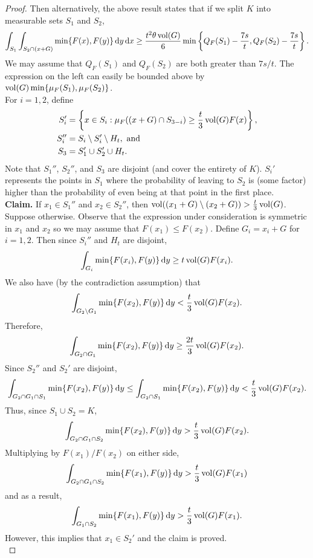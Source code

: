 \begin{proof}
	Then alternatively, the above result states that if we split $K$ into measurable sets $S_1$ and $S_2$,
	\[ \int_{S_1} \int_{S_2\cap (x+G)} \min\{F(x),F(y)\}\operatorname{d}\!{y}\operatorname{d}\!{x} \geq \frac{t^2\theta\operatorname{vol}(G)}{6} \min\left\{Q_F(S_1)-\frac{7s}{t}, Q_F(S_2)-\frac{7s}{t}\right\}. \]
	We may assume that $Q_F(S_1)$ and $Q_F(S_2)$ are both greater than $7s/t$. The expression on the left can easily be bounded above by $\operatorname{vol}(G)\min\{\mu_F(S_1),\mu_F(S_2)\}$.\\
	For $i=1,2$, define
	\begin{align*}
		S_i' &= \left\{x\in S_i : \mu_F((x+G)\cap S_{3-i}) \geq \frac{t}{3}\operatorname{vol}(G)F(x) \right\}, \\
		S_i'' &= S_i \setminus S_i' \setminus H_t,\text{ and} \\
		S_3 &= S_1'\cup S_2'\cup H_t.
	\end{align*}
	Note that $S_1''$, $S_2''$, and $S_3$ are disjoint (and cover the entirety of $K$). $S_i'$ represents the points in $S_1$ where the probability of leaving to $S_2$ is (some factor) higher than the probability of even being at that point in the first place.\\

	\textbf{Claim.} If $x_1\in S_1''$ and $x_2\in S_2''$, then $\operatorname{vol}((x_1+G)\setminus(x_2+G))>\frac{t}{3}\operatorname{vol}(G)$.\\
	Suppose otherwise. Observe that the expression under consideration is symmetric in $x_1$ and $x_2$ so we may assume that $F(x_1)\leq F(x_2)$. Define $G_i=x_i+G$ for $i=1,2$. Then since $S_i''$ and $H_t$ are disjoint,
	\[ \int_{G_i} \min\{F(x_i), F(y)\}\operatorname{d}\!{y} \geq t\operatorname{vol}(G)F(x_i). \]
	We also have (by the contradiction assumption) that
	\[ \int_{G_2\setminus G_1} \min\{F(x_2),F(y)\}\operatorname{d}\!{y} < \frac{t}{3}\operatorname{vol}(G)F(x_2). \]
	Therefore,
	\[ \int_{G_2\cap G_1} \min\{F(x_2),F(y)\}\operatorname{d}\!{y} \geq \frac{2t}{3} \operatorname{vol}(G)F(x_2). \]
	Since $S_2''$ and $S_2'$ are disjoint,
	\[ \int_{G_2\cap G_1\cap S_1} \min\{F(x_2),F(y)\}\operatorname{d}\!{y} \leq \int_{G_2\cap S_1} \min\{F(x_2),F(y)\}\operatorname{d}\!{y} < \frac{t}{3}\operatorname{vol}(G)F(x_2). \]
	Thus, since $S_1\cup S_2 = K$,
	\[ \int_{G_2\cap G_1\cap S_2} \min\{F(x_2),F(y)\}\operatorname{d}\!{y} > \frac{t}{3}\operatorname{vol}(G)F(x_2). \]
	Multiplying by $F(x_1)/F(x_2)$ on either side,
	\[ \int_{G_2\cap G_1\cap S_2} \min\{F(x_1),F(y)\}\operatorname{d}\!{y} > \frac{t}{3}\operatorname{vol}(G)F(x_1) \]
	and as a result,
	\[ \int_{G_1\cap S_2} \min\{F(x_1),F(y)\}\operatorname{d}\!{y} > \frac{t}{3}\operatorname{vol}(G)F(x_1). \]
	However, this implies that $x_1\in S_2'$ and the claim is proved.\\


\end{proof}
